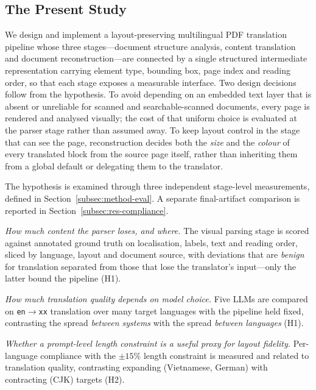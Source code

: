 \subsection{The Present Study}

We design and implement a layout-preserving multilingual PDF translation
pipeline whose three stages---document structure analysis, content translation
and document reconstruction---are connected by a single structured intermediate
representation carrying element type, bounding box, page index and reading
order, so that each stage exposes a measurable interface. Two design decisions
follow from the hypothesis. To avoid depending on an embedded text layer that is
absent or unreliable for scanned and searchable-scanned documents, every page is
rendered and analysed visually; the cost of that uniform choice is evaluated at
the parser stage rather than assumed away. To keep layout control in the stage
that can see the page, reconstruction decides both the \emph{size} and the
\emph{colour} of every translated block from the source page itself, rather than
inheriting them from a global default or delegating them to the translator.

The hypothesis is examined through three independent stage-level measurements,
defined in Section~\ref{subsec:method-eval}. A separate final-artifact comparison
is reported in Section~\ref{subsec:res-compliance}.

\begin{description}[leftmargin=0em,labelsep=0.4em,itemsep=0.15em]
  \item[M1] \emph{How much content the parser loses, and where.} The visual
  parsing stage is scored against annotated ground truth on localisation,
  labels, text and reading order, sliced by language, layout and document
  source, with deviations that are \emph{benign} for translation separated from
  those that lose the translator's input---only the latter bound the pipeline
  (H1).
  \item[M2] \emph{How much translation quality depends on model choice.} Five
  LLMs are compared on \texttt{en}$\rightarrow$\texttt{xx} translation over many
  target languages with the pipeline held fixed, contrasting the spread
  \emph{between systems} with the spread \emph{between languages} (H1).
  \item[M3] \emph{Whether a prompt-level length constraint is a useful proxy for
  layout fidelity.} Per-language compliance with the $\pm15\%$ length constraint is
  measured and related to translation quality, contrasting expanding
  (Vietnamese, German) with contracting (CJK) targets (H2).
\end{description}

